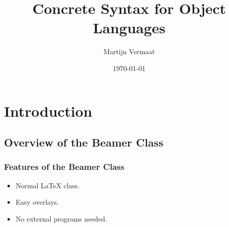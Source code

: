 \documentclass{beamer}
\title{Concrete Syntax for Object Languages}
\author{Martijn Vermaat}
\date{\today}
\begin{document}
\frame{\titlepage}

\section[Outline]{}
\frame{\tableofcontents}

\section{Introduction}
\subsection{Overview of the Beamer Class}
\frame
{
  \frametitle{Features of the Beamer Class}

  \begin{itemize}
  \item<1-> Normal LaTeX class.
  \item<2-> Easy overlays.
  \item<3-> No external programs needed.      
  \end{itemize}
}
\end{document}
